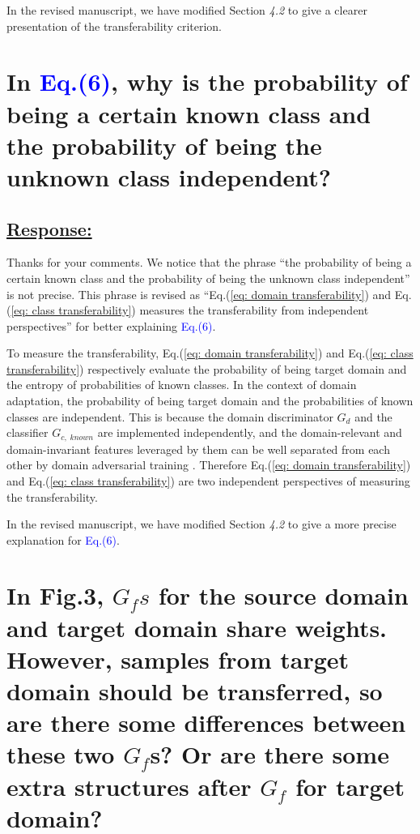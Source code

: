 In the revised manuscript, we have modified Section \textit{4.2} to give a clearer presentation of the transferability criterion.


\section{In \textcolor{blue}{Eq.(6)}, why is the probability of being a certain known class and the probability of being the unknown class independent? }
\subsection*{\underline{\textbf{Response:}}}

Thanks for your comments.
We notice that the phrase ``the probability of being a certain known class and the probability of being the unknown class independent'' is not precise.
This phrase is revised as ``Eq.(\ref{eq: domain transferability}) and Eq.(\ref{eq: class transferability}) measures the transferability from independent perspectives'' for better explaining \textcolor{blue}{Eq.(6)}.

To measure the transferability, Eq.(\ref{eq: domain transferability}) and Eq.(\ref{eq: class transferability}) respectively evaluate the probability of being target domain and the entropy of probabilities of known classes.
In the context of domain adaptation, the probability of being target domain and the probabilities of known classes are independent.
This is because the domain discriminator $G_d$ and the classifier $G_{c,\; known}$ are implemented independently, and the domain-relevant and domain-invariant features leveraged by them can be well separated from each other by domain adversarial training \cite{DomainAgnostic}.
Therefore Eq.(\ref{eq: domain transferability}) and Eq.(\ref{eq: class transferability}) are two independent perspectives of measuring the transferability.

In the revised manuscript, we have modified Section \textit{4.2} to give a more precise explanation for \textcolor{blue}{Eq.(6)}.



\section{In Fig.3, $G_fs$ for the source domain and target domain share weights.
However, samples from target domain should be transferred, so are there some differences between these two $G_f$s?
Or are there some extra structures after $G_f$ for target domain?}
